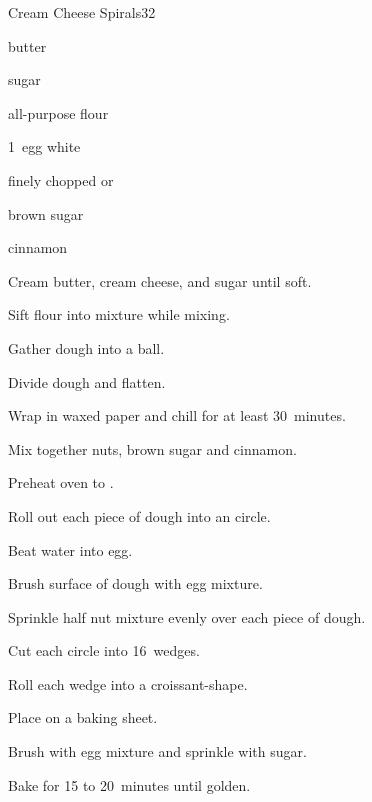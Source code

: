 \begin{recipe}{Cream Cheese Spirals}{}{32}

\begin{ingredients}
\item {} butter
\item {} 
\item \C{\quarter} sugar
\item {} all-purpose flour
\item 1~egg white
\item {} finely chopped  or 
\item \C{\half} brown sugar
\item {} cinnamon
\end{ingredients}

\begin{directions}
\item Cream butter, cream cheese, and sugar until soft.
\item Sift flour into mixture while mixing.
\item Gather dough into a ball.
\item Divide dough and flatten.
\item Wrap in waxed paper and chill for at least 30~minutes.
\item Mix together nuts, brown sugar and cinnamon.
\item Preheat oven to .
\item Roll out each piece of dough into an  circle.
\item Beat  water into egg.
\item Brush surface of dough with egg mixture.
\item Sprinkle half nut mixture evenly over each piece of dough.
\item Cut each circle into 16~wedges.
\item Roll each wedge into a croissant-shape.
\item Place on a baking sheet.
\item Brush with egg mixture and sprinkle with sugar.
\item Bake for 15 to 20~minutes until golden.
\end{directions}

\end{recipe}
